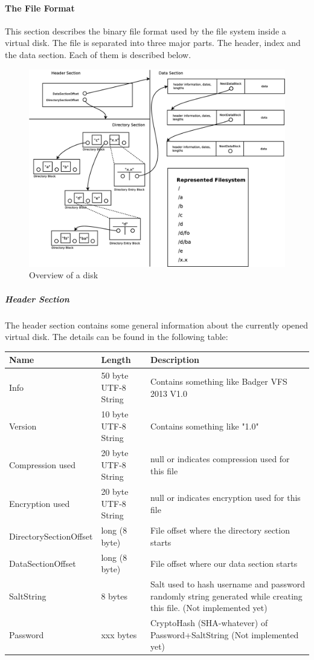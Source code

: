 \paragraph{The File Format}\label{sec:file_format}
This section describes the binary file format used by the file system inside a
virtual disk. The file is separated into three major parts. The header, index
and the data section. Each of them is described below.

\begin{figure}[h!]
\centering
\includegraphics[width=1\textwidth]{figures/fileFormat.eps}
\caption{Overview of a disk}
\label{fig:disk_overview}
\end{figure}

\subparagraph{Header Section} The header section contains some general information
about the currently opened virtual disk. The details can be found in the
following table:

\begin{tabular}{|l|l|p{5cm}|}
\hline
\textbf{Name} & \textbf{Length} & \textbf{Description}
\\  \hline
Info & 50 byte UTF-8 String & Contains something like Badger VFS 2013 V1.0
\\ \hline
Version & 10 byte UTF-8 String & Contains something like "1.0"
\\ \hline
Compression used & 20 byte UTF-8 String & null or indicates compression used for this file
\\ \hline
Encryption used & 20 byte UTF-8 String & null or indicates encryption used for this file
\\ \hline
DirectorySectionOffset & long (8 byte) &  File offset where the directory
section starts \\ \hline
DataSectionOffset & long (8 byte) &  File offset where our data section starts
\\ \hline
 SaltString & 8 bytes  & Salt used to hash username and password randomly string generated while creating this
   file. (Not implemented yet)
 \\ \hline
  Password & xxx bytes  & CryptoHash (SHA-whatever) of Password+SaltString  (Not implemented yet)
\\ \hline

\end{tabular}


